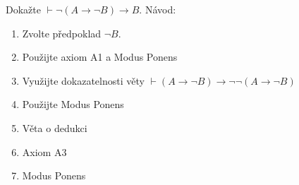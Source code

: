 Dokažte $\vdash \neg (A \rightarrow \neg B ) \rightarrow B$.
Návod:
\begin{enumerate}[1)]
	\item Zvolte předpoklad $\neg B$.
	\item Použijte axiom A1 a Modus Ponens
	\item Využijte dokazatelnosti věty $\vdash (A \rightarrow \neg B) \rightarrow \neg \neg (A \rightarrow \neg B)$
	\item Použijte Modus Ponens
	\item Věta o dedukci
	\item Axiom A3
	\item Modus Ponens
\end{enumerate}
